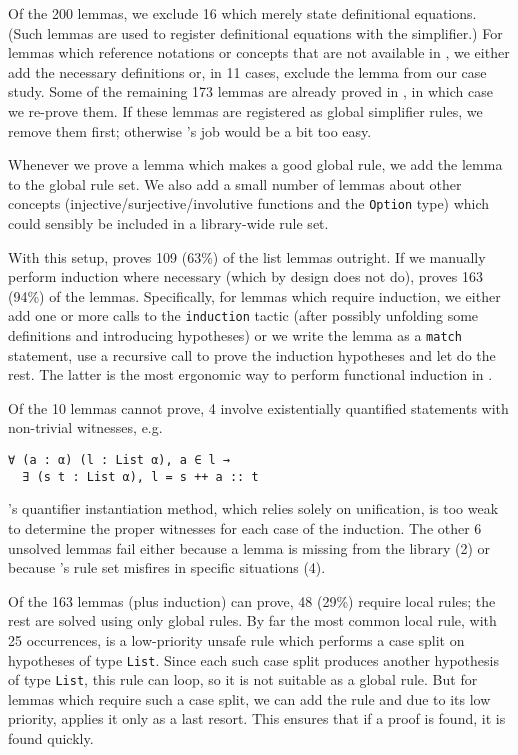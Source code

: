 Of the 200 lemmas, we exclude 16 which merely state definitional equations.
(Such lemmas are used to register definitional equations with the simplifier.)
For lemmas which reference notations or concepts that are not available in \Leanfour, we either add the necessary definitions or, in 11 cases, exclude the lemma from our case study.
Some of the remaining 173 lemmas are already proved in \Leanfour, in which case we re-prove them.
If these lemmas are registered as global simplifier rules, we remove them first; otherwise \Aesop's job would be a bit too easy.

Whenever we prove a lemma which makes a good global \Aesop{} rule, we add the lemma to the global \Aesop{} rule set.
We also add a small number of lemmas about other concepts (injective/surjective/involutive functions and the \texttt{Option} type) which could sensibly be included in a library-wide \Aesop{} rule set.

With this setup, \Aesop{} proves 109 (63\%) of the list lemmas outright.
If we manually perform induction where necessary (which \Aesop{} by design does not do), \Aesop{} proves 163 (94\%) of the lemmas.
Specifically, for lemmas which require induction, we either add one or more calls to the \texttt{induction} tactic (after possibly unfolding some definitions and introducing hypotheses) or we write the lemma as a \texttt{match} statement, use a recursive call to prove the induction hypotheses and let \Aesop{} do the rest.
The latter is the most ergonomic way to perform functional induction in \Lean.

Of the 10 lemmas \Aesop{} cannot prove, 4 involve existentially quantified statements with non-trivial witnesses, e.g.
\begin{lstlisting}
∀ (a : α) (l : List α), a ∈ l →
  ∃ (s t : List α), l = s ++ a :: t
\end{lstlisting}
\Aesop's quantifier instantiation method, which relies solely on unification, is too weak to determine the proper witnesses for each case of the induction.
The other 6 unsolved lemmas fail either because a lemma is missing from the library (2) or because \Aesop's rule set misfires in specific situations (4).

Of the 163 lemmas \Aesop{} (plus induction) can prove, 48 (29\%) require local rules; the rest are solved using only global rules.
By far the most common local rule, with 25 occurrences, is a low-priority unsafe rule which performs a case split on hypotheses of type \texttt{List}.
Since each such case split produces another hypothesis of type \texttt{List}, this rule can loop, so it is not suitable as a global rule.
But for lemmas which require such a case split, we can add the rule and due to its low priority, \Aesop{} applies it only as a last resort.
This ensures that if a proof is found, it is found quickly.

